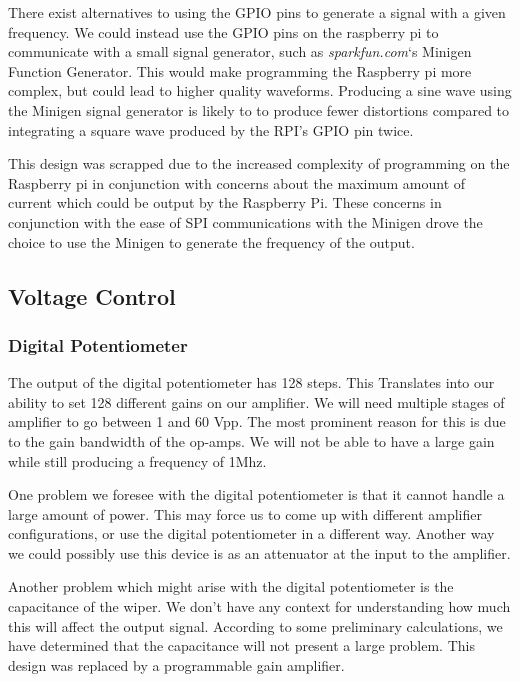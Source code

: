 \documentclass{article}	%
\begin{document}
\begin{multicols}{2}
There exist alternatives to using the GPIO pins to generate a signal with a given frequency. We could instead use the GPIO pins on the raspberry pi to communicate with a small signal generator, such as \textit{sparkfun.com}‘s Minigen Function Generator. This would make programming the Raspberry pi more complex, but could lead to higher quality waveforms. Producing a sine wave using the Minigen signal generator is likely to to produce fewer distortions compared to integrating a square wave produced by the RPI’s GPIO pin twice. 

This design was scrapped due to the increased complexity of programming on
the Raspberry pi in conjunction with
concerns about the maximum amount of current which could be output
by the Raspberry Pi.
These concerns in conjunction with the ease of SPI communications
with the Minigen drove the choice to use the Minigen to generate the
frequency of the output.

\subsection{Voltage Control}
\subsubsection{Digital Potentiometer}
The output of the digital potentiometer has 128 steps. This Translates into our ability to set 128 different gains on our amplifier. We will need multiple stages of amplifier to go between 1 and 60 Vpp. The most prominent reason for this is due to the gain bandwidth of the op-amps. We will not be able to have a large gain while still producing a frequency of 1Mhz.

One problem we foresee with the digital potentiometer is that it cannot handle a large amount of power. This may force us to come up with different amplifier configurations, or use the digital potentiometer in a different way. Another way we could possibly use this device is as an attenuator at the input to the amplifier.

Another problem which might arise with the digital potentiometer is the capacitance of the wiper. We don’t have any context for understanding how much this will affect the output signal. According to some preliminary calculations, we have determined that the capacitance will not present a large problem.
This design was replaced by a programmable gain amplifier.


\end{multicols}
\end{document}
